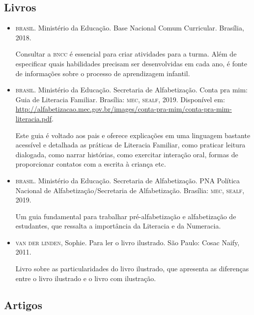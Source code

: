 \documentclass[11pt]{extarticle}
\begin{document}
\subsection{Livros}

\begin{itemize}
\item \textsc{brasil}. Ministério da Educação. Base Nacional Comum Curricular. Brasília, 2018.

Consultar a \textsc{bncc} é essencial para criar atividades para a turma. Além de especificar 
quais habilidades precisam ser desenvolvidas em cada ano, é fonte de informações sobre 
o processo de aprendizagem infantil. 

\item \textsc{brasil}. Ministério da Educação. Secretaria de Alfabetização. Conta pra mim: Guia de Literacia Familiar. 
Brasília: \textsc{mec, sealf}, 2019. Disponível em: \url{http://alfabetizacao.mec.gov.br/images/conta-pra-mim/conta-pra-mim-literacia.pdf}.

Este guia é voltado aos pais e oferece explicações em uma linguagem bastante acessível e detalhada as práticas de Literacia Familiar, 
como praticar leitura dialogada, como narrar histórias, como exercitar interação oral, formas de proporcionar contatos com a escrita à criança etc. 
 
\item \textsc{brasil}. Ministério da Educação. Secretaria de Alfabetização. PNA Política Nacional de Alfabetização/Secretaria 
de Alfabetização. Brasília: \textsc{mec, sealf}, 2019.

Um guia fundamental para trabalhar pré-alfabetização e alfabetização de estudantes, que ressalta a importância da Literacia e da Numeracia. 

\item \textsc{van der linden}, Sophie. Para ler o livro ilustrado. São Paulo: Cosac Naify, 2011.

Livro sobre as particularidades do livro ilustrado, que apresenta as diferenças entre o livro ilustrado e o livro com ilustração. 
\end{itemize}

\subsection{Artigos}
\end{document}
